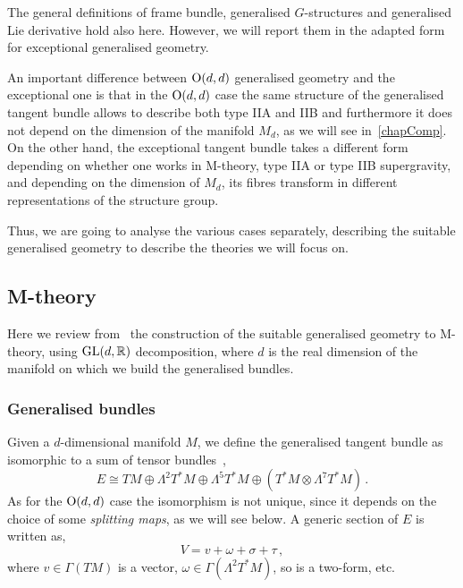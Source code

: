 \documentclass[debug]{phd}
\begin{document}
			The general definitions of frame bundle, generalised $G$-structures and generalised Lie derivative hold also here.
			However, we will report them in the adapted form for exceptional generalised geometry.
			
			An important difference between $\mathrm{O}(d, d)$ generalised geometry and the exceptional one is that in the $\mathrm{O}(d,d)$ case the same structure of the generalised tangent bundle allows to describe both type IIA and IIB and furthermore it does not depend on the dimension of the manifold $M_d$, as we will see in~\cref{chapComp}. 
			On the other hand, the exceptional tangent bundle takes a different form depending on whether one works in M-theory, type IIA or type IIB supergravity, and depending on the dimension of $M_d$, its fibres transform in different representations of the structure group.
			
			Thus, we are going to analyse the various cases separately, describing the suitable generalised geometry to describe the theories we will focus on.
			\subsection{M-theory}\label{sec:MthExcGeom}
				Here we review from~\cite{waldram2} the construction of the suitable generalised geometry to M-theory, using $\mathrm{GL}(d,\mathbb{R})$ decomposition, where $d$ is the real dimension of the manifold on which we build the generalised bundles.
				\subsubsection{Generalised bundles}
						Given a $d$-dimensional manifold $M$, we define the generalised tangent bundle as isomorphic to a sum of tensor bundles~\cite{hull1, waldram5},
								\begin{equation}\label{MthExBun}
									E \cong TM \oplus \Lambda^2 T^*M \oplus \Lambda^5 T^*M \oplus (T^*M \otimes \Lambda^7 T^*M) \, .
								\end{equation}
						As for the $\mathrm{O}(d,d)$ case the isomorphism is not unique, since it depends on the choice of some \emph{splitting maps}, as we will see below.
						A generic section of $E$ is written as,
								\begin{equation}
									V = v + \omega + \sigma + \tau \, ,
								\end{equation}
						where $v \in \Gamma(TM)$ is a vector, $\omega \in \Gamma(\Lambda^2 T^*M)$, so is a two-form, etc.
						
\end{document}
